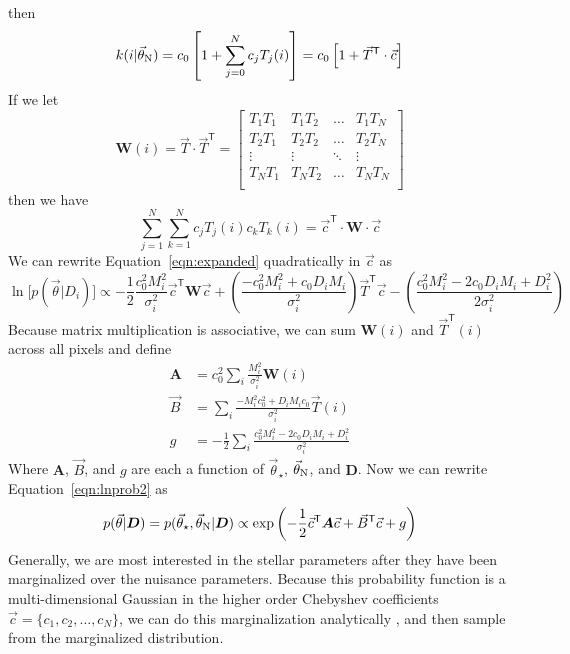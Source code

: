 \documentclass[preprint]{aastex} %
\newcommand{\vt}{\vec{\theta}}
\newcommand{\vstar}{\vt_{\star}}
\newcommand{\vN}{\vt_{\rm N}}
\newcommand{\vc}{\vec{c}}
\newcommand{\fMi}{M_i}
\newcommand{\fD}{ {\bm D}}
\newcommand{\fDi}{D_i}
\newcommand{\trans}{\mathsf{T}}
\begin{document}
then 
\begin{equation}
  k(i| \vN) = c_0 \left [ 1 + \sum^N_{j = 0} c_j T_j(i) \right ] = c_0 \left[ 1+ \vec{T}^\trans \cdot \vc \right]
\end{equation}
If we let 
\begin{equation}
  {\bm W}(i) = \vec{T} \cdot \vec{T}^\trans = 
  \begin{bmatrix}
T_1 T_1 & T_1 T_2 &  \hdots & T_1 T_N \\
T_2 T_1 & T_2 T_2 &  \hdots & T_2 T_N \\
\vdots  & \vdots  &  \ddots & \vdots \\
T_N T_1 & T_N T_2 &  \hdots & T_N T_N \\
  \end{bmatrix}
\end{equation}
then we have
\begin{equation}
  \sum_{j =1}^N \sum_{k=1}^N c_j T_j(i) c_k T_k(i) = \vc^\trans \cdot {\bm W} \cdot \vc
\end{equation}
We can rewrite Equation~\ref{eqn:expanded} quadratically in $\vc$ as
\begin{equation}
  \ln \bigl [p(\vt | \fDi) \bigr] \propto - \frac{1}{2} \frac{c_0^2 \fMi^2}{\sigma_i^2}  \vc^\trans {\bm W} \vc + \left (\frac{- c_0^2 \fMi^2 + c_0 \fDi \fMi}{\sigma_i^2} \right ) \vec{T}^\trans \vc -  \left( \frac{c_0^2 \fMi^2 - 2 c_0 \fDi \fMi + \fDi^2}{2 \sigma_i^2} \right)
\end{equation}
Because matrix multiplication is associative, we can sum ${\bm W(i)}$ and $\vec{T}^\trans(i)$ across all pixels and define
\begin{align}
  {\bm A} &= c_0^2 \sum_{i} \frac{\fMi^2}{\sigma_i^2} {\bm W}(i) \\
  \vec{B} &= \sum_{i} \frac{-\fMi^2 c_0^2 + \fDi \fMi c_0}{\sigma_i^2} \vec{T}(i)\\
  g &= -\frac{1}{2} \sum_{i} \frac{c_0^2 \fMi^2 - 2 c_0 \fDi \fMi + \fDi^2}{\sigma_i^2} 
\end{align}
Where ${\bm A}$, $\vec{B}$, and $g$ are each a function of $\vstar$, $\vN$, and $\fD$. Now we can rewrite Equation~\ref{eqn:lnprob2} as 
\begin{equation}
  p(\vt | \fD) = p(\vstar, \vN | \fD) \propto \exp \left ( - \frac{1}{2} \vc^\trans {\bm A} \vc + \vec{B}^\trans \vc + g \right )
  \label{eqn:lnprob_matrix}
\end{equation}
Generally, we are most interested in the stellar parameters after they have been marginalized over the nuisance parameters. Because this probability function is a multi-dimensional Gaussian in the higher order Chebyshev coefficients $\vc = \{c_1, c_2, \ldots, c_N \}$, we can do this marginalization analytically \citep{sgd+09}, and then sample from the marginalized distribution. 
\end{document}
